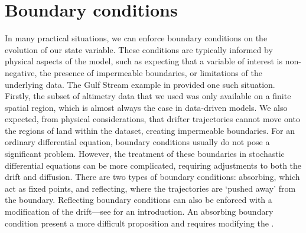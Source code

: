 \section{Boundary conditions}\label{sec:disc_bc}
In many practical situations, we can enforce boundary conditions on the evolution of our state variable.
These conditions are typically informed by physical aspects of the model, such as expecting that a variable of interest is non-negative, the presence of impermeable boundaries, or limitations of the underlying data.
The Gulf Stream example in  provided one such situation.
Firstly, the subset of altimetry data that we used was only available on a finite spatial region, which is almost always the case in data-driven models.
We also expected, from physical considerations, that drifter trajectories cannot move onto the regions of land within the dataset, creating impermeable boundaries.
For an ordinary differential equation, boundary conditions usually do not pose a significant problem.
However, the treatment of these boundaries in stochastic differential equations can be more complicated, requiring adjustments to both the drift and diffusion.
There are two types of boundary conditions: absorbing, which act as fixed points, and reflecting, where the trajectories are `pushed away' from the boundary.
Reflecting boundary conditions can also be enforced with a modification of the drift---see \citet{Pilipenko_2014_IntroductionStochasticDifferential} for an introduction.
An absorbing boundary condition present a more difficult proposition \citep{Mannella_1999_AbsorbingBoundariesOptimal,CorrealesEscudero_2019_ItoVsStratonovich,TouboulWainrib_2015_DynamicsAbsorptionProperties} and requires modifying the .


